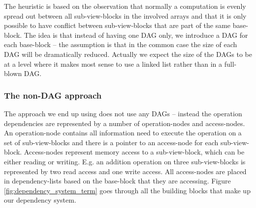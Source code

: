 \documentclass[preprint]{../PGAS10/sigplanconf}
\begin{document}
The heuristic is based on the observation that normally a computation is evenly spread out between all sub-view-blocks in the involved arrays and that it is only possible to have conflict between sub-view-blocks that are part of the same base-block. The idea is that instead of having one DAG only, we introduce a DAG for each base-block -- the assumption is that in the common case the size of each DAG will be dramatically reduced. Actually we expect the size of the DAGs to be at a level where it makes most sense to use a linked list rather than in a full-blown DAG.


\subsubsection{The non-DAG approach}
The approach we end up using does not use any DAGs -- instead the operation dependencies are represented by a number of operation-nodes and access-nodes. An operation-node contains all information need to execute the operation on a set of sub-view-blocks and there is a pointer to an access-node for each sub-view-block. Access-nodes represent memory access to a sub-view-block, which can be either reading or writing. E.g. an addition operation on three sub-view-blocks is represented by two read access and one write access. All access-nodes are placed in dependency-lists based on the base-block that they are accessing. Figure \ref{fig:dependency_system_term} goes through all the building blocks that make up our dependency system.

\end{document}

